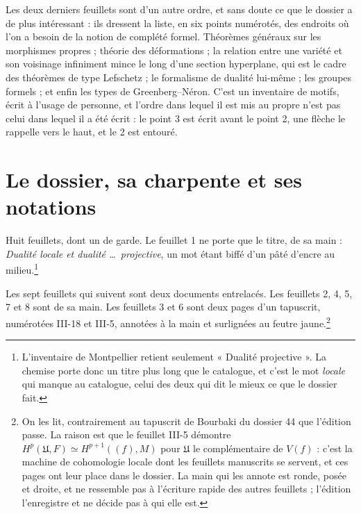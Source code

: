 \documentclass[11pt,a4paper]{article}
\begin{document}
\begin{resume}
Les deux derniers feuillets sont d'un autre ordre, et sans doute ce que le
dossier a de plus intéressant : ils dressent
la liste, en six points numérotés, des endroits où l'on a besoin de la notion
de complété formel. Théorèmes généraux sur les morphismes propres ; théorie
des déformations ; la relation entre une variété et son voisinage infiniment
mince le long d'une section hyperplane, qui est le cadre des théorèmes de type
Lefschetz ; le formalisme de dualité lui-même ; les groupes formels ; et enfin
les types de Greenberg--Néron. C'est un inventaire de motifs, écrit à l'usage
de personne, et l'ordre dans lequel il est mis au propre n'est pas celui dans
lequel il a été écrit : le point 3 est écrit avant le point 2, une flèche le
rappelle vers le haut, et le 2 est entouré.

\end{resume}

\section*{Le dossier, sa charpente et ses notations}

Huit feuillets, dont un de garde. Le feuillet 1 ne porte que le titre, de sa
main : \emph{Dualité locale et dualité \ldots\ projective}, un mot étant biffé
d'un pâté d'encre au milieu.\footnote{L'inventaire de Montpellier retient
seulement « Dualité projective ». La chemise porte donc un titre plus long que
le catalogue, et c'est le mot \emph{locale} qui manque au catalogue, celui des deux qui dit le mieux ce que le dossier fait.}

Les sept feuillets qui suivent sont deux documents entrelacés. Les feuillets
2, 4, 5, 7 et 8 sont de sa main. Les feuillets 3 et 6 sont deux pages d'un
tapuscrit, numérotées III-18 et III-5, annotées à la main et surlignées au
feutre jaune.\footnote{On les lit, contrairement au tapuscrit de Bourbaki du
dossier 44 que l'édition passe. La raison est que le feuillet III-5 démontre
$H^{p}(\mathfrak{U}, F) \simeq H^{p+1}((f), M)$ pour $\mathfrak{U}$ le
complémentaire de $V(f)$ : c'est la machine de cohomologie locale
dont les feuillets manuscrits se servent, et ces pages ont leur place dans le
dossier. La main qui les annote est ronde, posée et droite, et ne
ressemble pas à l'écriture rapide des autres feuillets ; l'édition l'enregistre
et ne décide pas à qui elle est.}
\end{document}
